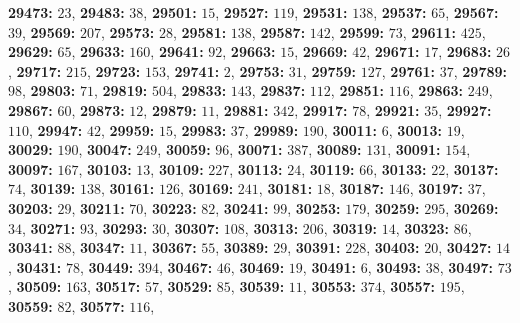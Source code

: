 \textsf{\bfseries 29473:} $23$, \textsf{\bfseries 29483:} $38$, \textsf{\bfseries 29501:} $15$, \textsf{\bfseries 29527:} $119$, \textsf{\bfseries 29531:} $138$, \textsf{\bfseries 29537:} $65$, \textsf{\bfseries 29567:} $39$, \textsf{\bfseries 29569:} $207$, \textsf{\bfseries 29573:} $28$, \textsf{\bfseries 29581:} $138$, \textsf{\bfseries 29587:} $142$, \textsf{\bfseries 29599:} $73$, \textsf{\bfseries 29611:} $425$, \textsf{\bfseries 29629:} $65$, \textsf{\bfseries 29633:} $160$, \textsf{\bfseries 29641:} $92$, \textsf{\bfseries 29663:} $15$, \textsf{\bfseries 29669:} $42$, \textsf{\bfseries 29671:} $17$, \textsf{\bfseries 29683:} $26$, \textsf{\bfseries 29717:} $215$, \textsf{\bfseries 29723:} $153$, \textsf{\bfseries 29741:} $2$, \textsf{\bfseries 29753:} $31$, \textsf{\bfseries 29759:} $127$, \textsf{\bfseries 29761:} $37$, \textsf{\bfseries 29789:} $98$, \textsf{\bfseries 29803:} $71$, \textsf{\bfseries 29819:} $504$, \textsf{\bfseries 29833:} $143$, \textsf{\bfseries 29837:} $112$, \textsf{\bfseries 29851:} $116$, \textsf{\bfseries 29863:} $249$, \textsf{\bfseries 29867:} $60$, \textsf{\bfseries 29873:} $12$, \textsf{\bfseries 29879:} $11$, \textsf{\bfseries 29881:} $342$, \textsf{\bfseries 29917:} $78$, \textsf{\bfseries 29921:} $35$, \textsf{\bfseries 29927:} $110$, \textsf{\bfseries 29947:} $42$, \textsf{\bfseries 29959:} $15$, \textsf{\bfseries 29983:} $37$, \textsf{\bfseries 29989:} $190$, \textsf{\bfseries 30011:} $6$, \textsf{\bfseries 30013:} $19$, \textsf{\bfseries 30029:} $190$, \textsf{\bfseries 30047:} $249$, \textsf{\bfseries 30059:} $96$, \textsf{\bfseries 30071:} $387$, \textsf{\bfseries 30089:} $131$, \textsf{\bfseries 30091:} $154$, \textsf{\bfseries 30097:} $167$, \textsf{\bfseries 30103:} $13$, \textsf{\bfseries 30109:} $227$, \textsf{\bfseries 30113:} $24$, \textsf{\bfseries 30119:} $66$, \textsf{\bfseries 30133:} $22$, \textsf{\bfseries 30137:} $74$, \textsf{\bfseries 30139:} $138$, \textsf{\bfseries 30161:} $126$, \textsf{\bfseries 30169:} $241$, \textsf{\bfseries 30181:} $18$, \textsf{\bfseries 30187:} $146$, \textsf{\bfseries 30197:} $37$, \textsf{\bfseries 30203:} $29$, \textsf{\bfseries 30211:} $70$, \textsf{\bfseries 30223:} $82$, \textsf{\bfseries 30241:} $99$, \textsf{\bfseries 30253:} $179$, \textsf{\bfseries 30259:} $295$, \textsf{\bfseries 30269:} $34$, \textsf{\bfseries 30271:} $93$, \textsf{\bfseries 30293:} $30$, \textsf{\bfseries 30307:} $108$, \textsf{\bfseries 30313:} $206$, \textsf{\bfseries 30319:} $14$, \textsf{\bfseries 30323:} $86$, \textsf{\bfseries 30341:} $88$, \textsf{\bfseries 30347:} $11$, \textsf{\bfseries 30367:} $55$, \textsf{\bfseries 30389:} $29$, \textsf{\bfseries 30391:} $228$, \textsf{\bfseries 30403:} $20$, \textsf{\bfseries 30427:} $14$, \textsf{\bfseries 30431:} $78$, \textsf{\bfseries 30449:} $394$, \textsf{\bfseries 30467:} $46$, \textsf{\bfseries 30469:} $19$, \textsf{\bfseries 30491:} $6$, \textsf{\bfseries 30493:} $38$, \textsf{\bfseries 30497:} $73$, \textsf{\bfseries 30509:} $163$, \textsf{\bfseries 30517:} $57$, \textsf{\bfseries 30529:} $85$, \textsf{\bfseries 30539:} $11$, \textsf{\bfseries 30553:} $374$, \textsf{\bfseries 30557:} $195$, \textsf{\bfseries 30559:} $82$, \textsf{\bfseries 30577:} $116$, 

